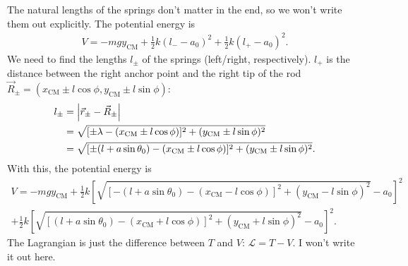 \documentclass{article}
\theoremstyle{definition}
\newcommand{\lag}{\mathcal{L}}
\newcommand{\f}[2]{\frac{#1}{#2}}
\newcommand{\lb}{\left[}
\newcommand{\rb}{\right]}
\begin{document}
\begin{enumerate}[label=(\alph*)]
	The natural lengths of the springs don't matter in the end, so we won't write them out explicitly. The potential energy is
	\begin{align*}
	V = -mgy_\text{CM} + \f{1}{2}k(l_- -a_0)^2 + \f{1}{2}k(l_+-a_0)^2.
	\end{align*}
	We need to find the lengths $l_\pm$ of the springs (left/right, respectively). $l_+$ is the distance between the right anchor point and the right tip of the rod $\vec{R}_\pm = (x_\text{CM} \pm l\cos\phi, y_\text{CM}\pm l\sin\phi)$:
	\begin{align*}
	l_\pm 
	&= \abs{\vec{r}_\pm - \vec{R}_\pm }\\
	&= \sqrt{[\pm \lambda - (x_\text{CM} \pm l\cos\phi)]^2 + (y_\text{CM} \pm l\sin\phi)^2}\\
	&= \sqrt{[\pm (l+a\sin\theta_0) - (x_\text{CM} \pm l\cos\phi)]^2 + (y_\text{CM}\pm l\sin\phi)^2}.
	\end{align*}
	With this, the potential energy is 
	\begin{align*}
	V = -mgy_\text{CM} + \f{1}{2}k\lb \sqrt{[- (l+a\sin\theta_0) - (x_\text{CM} - l\cos\phi)]^2 + (y_\text{CM}- l\sin\phi)^2} -a_0\rb^2 \\
	+ \f{1}{2}k\lb 
	\sqrt{[(l+a\sin\theta_0) - (x_\text{CM} + l\cos\phi)]^2 + (y_\text{CM}+ l\sin\phi)^2}   -a_0\rb^2.
	\end{align*}
	The Lagrangian is just the difference between $T$ and $V$: $\lag = T-V$. I won't write it out here. 
	

\end{enumerate}
\end{document}
